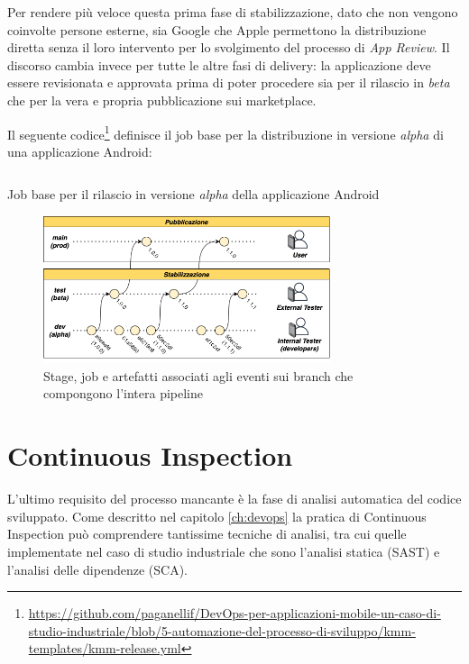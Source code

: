 Per rendere più veloce questa prima fase di stabilizzazione, dato che non vengono coinvolte persone esterne, sia Google che Apple permettono la distribuzione diretta senza il loro intervento per lo svolgimento del processo di \textit{App Review}. Il discorso cambia invece per tutte le altre fasi di delivery: la applicazione deve essere revisionata e approvata prima di poter procedere sia per il rilascio in \textit{beta} che per la vera e propria pubblicazione sui marketplace.

Il seguente codice\footnote{\href{https://github.com/paganellif/DevOps-per-applicazioni-mobile-un-caso-di-studio-industriale/blob/5-automazione-del-processo-di-sviluppo/kmm-templates/kmm-release.yml}{https://github.com/paganellif/DevOps-per-applicazioni-mobile-un-caso-di-studio-industriale/blob/5-automazione-del-processo-di-sviluppo/kmm-templates/kmm-release.yml}} definisce il job base per la distribuzione in versione \textit{alpha} di una applicazione Android:

\begin{listing}[H]
    \inputminted{yaml}{code/android-alpha-release-job.yaml}
    \caption{Job base per il rilascio in versione \textit{alpha} della applicazione Android}
\end{listing}

\begin{figure}[H]
    \centering
    \includegraphics[width=0.75\textwidth]{img/release-flow.png}
    \caption{Stage, job e artefatti associati agli eventi sui branch che compongono l'intera pipeline}
    \label{release-alpha-beta-flow}
\end{figure}

\section{Continuous Inspection}
L'ultimo requisito del processo mancante è la fase di analisi automatica del codice sviluppato. Come descritto nel capitolo \ref{ch:devops} la pratica di Continuous Inspection può comprendere tantissime tecniche di analisi, tra cui quelle implementate nel caso di studio industriale che sono l'analisi statica (SAST) e l'analisi delle dipendenze (SCA).

